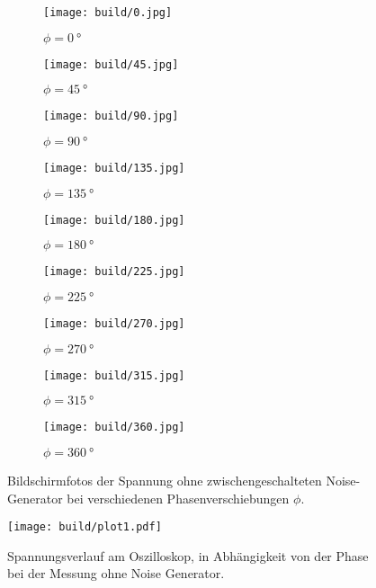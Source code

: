 \begin{figure}[H]
  \centering
  \begin{subfigure}{0.3\textwidth}
      \centering
      \texttt{[image: build/0.jpg]}
      \caption{$\phi = \SI{0}{\degree}$}
  \end{subfigure}
  \begin{subfigure}{0.3\textwidth}
    \centering
    \texttt{[image: build/45.jpg]}
    \caption{$\phi = \SI{45}{\degree}$}
  \end{subfigure}
  \begin{subfigure}{0.3\textwidth}
    \centering
    \texttt{[image: build/90.jpg]}
    \caption{$\phi = \SI{90}{\degree}$}
  \end{subfigure}
  \begin{subfigure}{0.3\textwidth}
    \centering
    \texttt{[image: build/135.jpg]}
    \caption{$\phi = \SI{135}{\degree}$}
  \end{subfigure}
  \begin{subfigure}{0.3\textwidth}
    \centering
    \texttt{[image: build/180.jpg]}
    \caption{$\phi = \SI{180}{\degree}$}
  \end{subfigure}
  \begin{subfigure}{0.3\textwidth}
    \centering
    \texttt{[image: build/225.jpg]}
    \caption{$\phi = \SI{225}{\degree}$}
  \end{subfigure}
  \begin{subfigure}{0.3\textwidth}
    \centering
    \texttt{[image: build/270.jpg]}
    \caption{$\phi = \SI{270}{\degree}$}
  \end{subfigure}
  \begin{subfigure}{0.3\textwidth}
    \centering
    \texttt{[image: build/315.jpg]}
    \caption{$\phi = \SI{315}{\degree}$}
  \end{subfigure}
  \begin{subfigure}{0.3\textwidth}
    \centering
    \texttt{[image: build/360.jpg]}
    \caption{$\phi = \SI{360}{\degree}$}
  \end{subfigure}
  \caption{Bildschirmfotos der Spannung ohne zwischengeschalteten Noise-Generator bei verschiedenen Phasenverschiebungen $\phi$.}
  \label{fig:Oszilloskop1}
\end{figure}

\begin{figure}[H]
  \centering
  \texttt{[image: build/plot1.pdf]}
  \caption{Spannungsverlauf am Oszilloskop, in Abhängigkeit von der Phase bei der Messung ohne Noise Generator.}
  \label{fig:plot1}
\end{figure}

